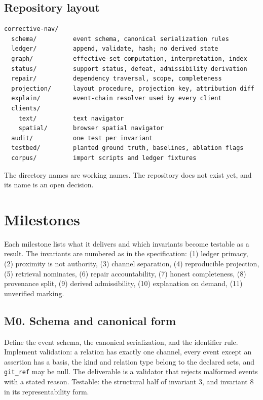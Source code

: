 \documentclass[11pt]{article}
\newcommand{\ev}[1]{\texttt{#1}}
\begin{document}
\subsection{Repository layout}

\begin{verbatim}
corrective-nav/
  schema/          event schema, canonical serialization rules
  ledger/          append, validate, hash; no derived state
  graph/           effective-set computation, interpretation, index
  status/          support status, defeat, admissibility derivation
  repair/          dependency traversal, scope, completeness
  projection/      layout procedure, projection key, attribution diff
  explain/         event-chain resolver used by every client
  clients/
    text/          text navigator
    spatial/       browser spatial navigator
  audit/           one test per invariant
  testbed/         planted ground truth, baselines, ablation flags
  corpus/          import scripts and ledger fixtures
\end{verbatim}

The directory names are working names. The repository does not exist yet, and its name is an open decision.

\section{Milestones}

Each milestone lists what it delivers and which invariants become testable as a result. The invariants are numbered as in the specification: (1) ledger primacy, (2) proximity is not authority, (3) channel separation, (4) reproducible projection, (5) retrieval nominates, (6) repair accountability, (7) honest completeness, (8) provenance split, (9) derived admissibility, (10) explanation on demand, (11) unverified marking.

\subsection*{M0. Schema and canonical form}

Define the event schema, the canonical serialization, and the identifier rule. Implement validation: a relation has exactly one channel, every event except an assertion has a basis, the kind and relation type belong to the declared sets, and \ev{git\_ref} may be null. The deliverable is a validator that rejects malformed events with a stated reason. Testable: the structural half of invariant 3, and invariant 8 in its representability form.
\end{document}
